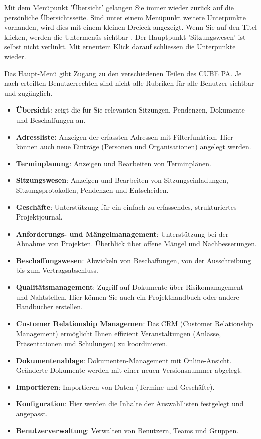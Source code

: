 \vspace{\baselineskip}

Mit dem Menüpunkt 'Übersicht'  gelangen Sie immer wieder zurück auf die persönliche Übersichtsseite. Sind unter einem Menüpunkt weitere Unterpunkte vorhanden, wird dies mit einem kleinen Dreieck angezeigt. Wenn Sie auf den Titel klicken, werden die Untermenüs sichtbar . Der Hauptpunkt 'Sitzungswesen' ist selbst nicht verlinkt. Mit erneutem Klick darauf schliessen die Unterpunkte wieder.

\vspace{\baselineskip}

Das Haupt-Menü gibt Zugang zu den verschiedenen Teilen des CUBE PA. Je nach erteilten Benutzerrechten sind nicht alle Rubriken für alle Benutzer sichtbar und zugänglich.

\begin{itemize}
\item
\textbf{Übersicht}: zeigt die für Sie relevanten Sitzungen, Pendenzen, Dokumente und Beschaffungen an.
\item
\textbf{Adressliste: }Anzeigen der erfassten Adressen mit Filterfunktion. Hier können auch neue Einträge (Personen und Organisationen) angelegt werden.
\item
\textbf{Terminplanung}: Anzeigen und Bearbeiten von Terminplänen.
\item
\textbf{Sitzungswesen}: Anzeigen und Bearbeiten von Sitzungseinladungen, Sitzungsprotokollen, Pendenzen und
Entscheiden.
\item
\textbf{Geschäfte}: Unterstützung für ein einfach zu erfassendes, strukturiertes Projektjournal.
\item
\textbf{Anforderungs- und Mängelmanagement}: Unterstützung bei der Abnahme von Projekten. Überblick über offene Mängel und Nachbesserungen.
\item
\textbf{Beschaffungswesen}: Abwickeln von Beschaffungen, von der Ausschreibung bis zum Vertragsabschluss.
\item
\textbf{Qualitätsmanagement}: Zugriff auf Dokumente über Risikomanagement und Nahtstellen. Hier können Sie auch ein Projekthandbuch oder andere Handbücher erstellen.
\item
\textbf{Customer Relationship Managemen}: Das CRM (Customer Relationship Management) ermöglicht Ihnen effizient Veranstaltungen (Anlässe, Präsentationen und Schulungen) zu koordinieren.
\item
\textbf{Dokumentenablage}: Dokumenten-Management mit Online-Ansicht. Geänderte Dokumente werden mit einer neuen Versionsnummer abgelegt.
\item
\textbf{Importieren}: Importieren von Daten (Termine und Geschäfte).
\item
\textbf{Konfiguration}: Hier werden die Inhalte der Auswahllisten festgelegt und angepasst.
\item
\textbf{Benutzerverwaltung}: Verwalten von Benutzern, Teams und Gruppen.
\end{itemize}

